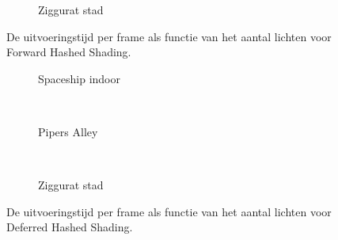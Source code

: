 \begin{figure}[t]
\begin{minipage}[t]{0.5\textwidth}
  \begin{adjustbox}{minipage=\textwidth, scale=0.55}
    \begin{subfigure}[b]{1.6\textwidth}
      \centering
      \def\svgwidth{\textwidth}
      
      \caption{Ziggurat stad}
      \label{fig:hs-compare-lights:forward:city}
    \end{subfigure}
  \end{adjustbox}
  \caption{\small De uitvoeringstijd per frame als functie van het aantal lichten voor Forward Hashed Shading.}
  \label{fig:hs-compare-lights:forward}
  \end{minipage}%
  \begin{minipage}[t]{0.5\textwidth}
  \begin{adjustbox}{minipage=\textwidth, scale=0.55}
    \begin{subfigure}[b]{1.6\textwidth}
      \centering
      \def\svgwidth{\textwidth}
      
      \caption{Spaceship indoor}
      \vspace{4pt}
      \label{fig:hs-compare-lights:deferred:indoor}
    \end{subfigure}
  \end{adjustbox} \\
  \begin{adjustbox}{minipage=\textwidth, scale=0.55}
    \begin{subfigure}[b]{1.6\textwidth}
      \centering
      \def\svgwidth{\textwidth}
      
      \caption{Pipers Alley}
      \vspace{4pt}
      \label{fig:hs-compare-lights:deferred:alley}
    \end{subfigure}
  \end{adjustbox} \\
  \begin{adjustbox}{minipage=\textwidth, scale=0.55}
    \begin{subfigure}[b]{1.6\textwidth}
      \centering
      \def\svgwidth{\textwidth}
      
      \caption{Ziggurat stad}
      \label{fig:hs-compare-lights:deferred:city}
    \end{subfigure}
  \end{adjustbox}
  \caption{\small De uitvoeringstijd per frame als functie van het aantal lichten voor Deferred Hashed Shading.}
  \label{fig:hs-compare-lights:deferred}
  \end{minipage} 
\end{figure}
